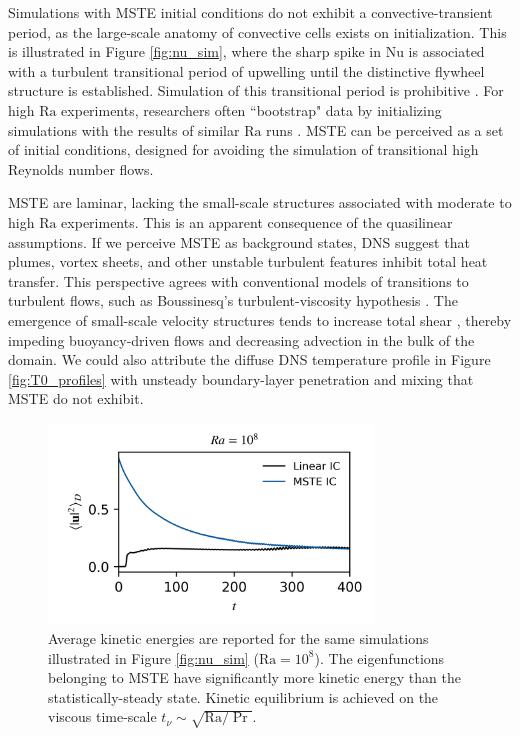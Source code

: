 \documentclass[reprint,amsmath,amssymb,aps]{revtex4-1}
\newcommand\Ra{\mathrm{Ra}}
\newcommand\Nu{\mathrm{Nu}}
\begin{document}
Simulations with MSTE initial conditions do not exhibit a convective-transient period, as the large-scale anatomy of convective cells exists on initialization. 
This is illustrated in Figure \ref{fig:nu_sim}, where the sharp spike in $\Nu$ is associated with a turbulent transitional period of upwelling until the distinctive flywheel structure is established. 
Simulation of this transitional period is prohibitive \cite{Anders_AE}. 
For high $\Ra$ experiments, researchers often ``bootstrap" data by initializing simulations with the results of similar $\Ra$ runs \cite{Verzicco, Johnston}. 
MSTE can be perceived as a set of initial conditions, designed for avoiding the simulation of transitional high Reynolds number flows.

MSTE are laminar, lacking the small-scale structures associated with moderate to high $\Ra$ experiments. 
This is an apparent consequence of the quasilinear assumptions. 
If we perceive MSTE as background states, DNS suggest that plumes, vortex sheets, and other unstable turbulent features inhibit total heat transfer. 
This perspective agrees with conventional models of transitions to turbulent flows, such as Boussinesq's turbulent-viscosity hypothesis \cite{boussinesq_1877}. The emergence of small-scale velocity structures tends to increase total shear \cite{Lecoanet_KH, drazin_reid_2004, pope_2000}, thereby impeding buoyancy-driven flows and decreasing advection in the bulk of the domain. 
We could also attribute the diffuse DNS temperature profile in Figure \ref{fig:T0_profiles} with unsteady boundary-layer penetration and mixing that MSTE do not exhibit.

\begin{figure}
    \begin{minipage}{3.4in}
        \centering
        \includegraphics[width=3.4in]{sim_eq_ke.png}
        \caption{Average kinetic energies are reported for the same simulations illustrated in Figure \ref{fig:nu_sim} ($\Ra = 10^8$). 
        The eigenfunctions belonging to MSTE have significantly more kinetic energy than the statistically-steady state. 
        Kinetic equilibrium is achieved on the viscous time-scale $t_{\nu} \sim \sqrt{\Ra / \Pr}$.}
        \label{fig:ke_sim}
    \end{minipage}
\end{figure}
\end{document}
